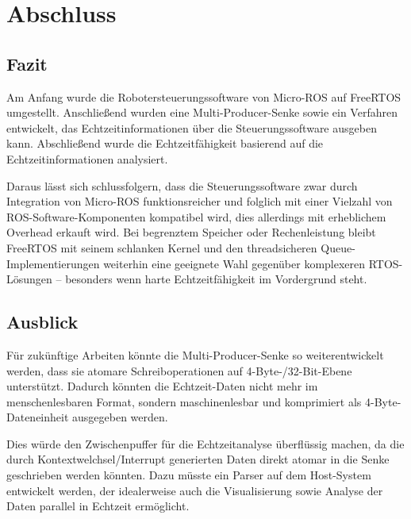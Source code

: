 \section{Abschluss}

\subsection{Fazit}

Am Anfang wurde die Robotersteuerungssoftware von Micro-ROS auf FreeRTOS
umgestellt. Anschließend wurden eine Multi-Producer-Senke sowie ein Verfahren
entwickelt, das Echtzeitinformationen über die Steuerungssoftware ausgeben kann.
Abschließend wurde die Echtzeitfähigkeit basierend auf die Echtzeitinformationen
analysiert.

Daraus lässt sich schlussfolgern, dass die Steuerungssoftware zwar durch
Integration von Micro-ROS funktionsreicher und folglich mit einer Vielzahl von
ROS-Software-Komponenten kompatibel wird, dies allerdings mit erheblichem
Overhead erkauft wird. Bei begrenztem Speicher oder Rechenleistung bleibt
FreeRTOS mit seinem schlanken Kernel und den threadsicheren
Queue-Implementierungen weiterhin eine geeignete Wahl gegenüber komplexeren
RTOS-Lösungen -- besonders wenn harte Echtzeitfähigkeit im Vordergrund steht.

\subsection{Ausblick}

Für zukünftige Arbeiten könnte die Multi-Producer-Senke so weiterentwickelt
werden, dass sie atomare Schreiboperationen auf 4-Byte-/32-Bit-Ebene
unterstützt. Dadurch könnten die Echtzeit-Daten nicht mehr im menschenlesbaren
Format, sondern maschinenlesbar und komprimiert als 4-Byte-Dateneinheit
ausgegeben werden.

Dies würde den Zwischenpuffer für die Echtzeitanalyse überflüssig machen, da die
durch Kontextwelchsel/Interrupt generierten Daten direkt atomar in die Senke
geschrieben werden könnten. Dazu müsste ein Parser auf dem Host-System
entwickelt werden, der idealerweise auch die Visualisierung sowie Analyse der
Daten parallel in Echtzeit ermöglicht.

